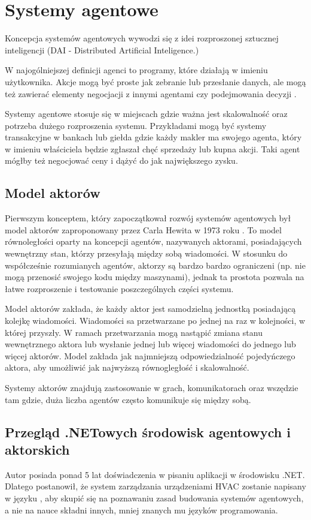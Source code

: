 \chapter{Systemy agentowe}
Koncepcja systemów agentowych wywodzi się z idei rozproszonej sztucznej inteligencji (DAI - Distributed Artificial Inteligence.)

W najogólniejszej definicji agenci to programy, które działają w imieniu użytkownika. 
Akcje mogą być proste jak zebranie lub przesłanie danych, ale mogą też zawierać elementy negocjacji z innymi agentami czy podejmowania decyzji \cite{bib:agenciNazewnictwo}. 

Systemy agentowe stosuje się w miejscach gdzie ważna jest skalowalność oraz potrzeba dużego rozproszenia systemu. 
Przykładami mogą być systemy transakcyjne w bankach lub giełda gdzie każdy makler ma swojego agenta, który w imieniu właściciela będzie zgłaszał chęć sprzedaży lub kupna akcji. Taki agent mógłby też negocjować ceny i dążyć do jak największego zysku.

\section{Model aktorów}
Pierwszym konceptem, który zapoczątkował rozwój systemów agentowych był model aktorów zaproponowany przez Carla Hewita w 1973 roku \cite{bib:aktorzyHewitt}. 
To model równoległości oparty na koncepcji agentów, nazywanych aktorami, posiadających wewnętrzny stan, którzy przesyłają między sobą wiadomości. W stosunku do współcześnie rozumianych agentów, aktorzy są bardzo bardzo ograniczeni (np. nie mogą przenosić swojego kodu między maszynami), jednak ta prostota pozwala na łatwe rozproszenie i testowanie poszczególnych części systemu. 

Model aktorów zakłada, że każdy aktor jest samodzielną jednostką posiadającą kolejkę wiadomości. Wiadomości sa przetwarzane po jednej na raz w kolejności, w której przyszły. W ramach przetwarzania mogą nastąpić zmiana stanu wewnętrznego aktora lub wysłanie jednej lub więcej wiadomości do jednego lub więcej aktorów. Model zakłada jak najmniejszą odpowiedzialność pojedyńczego aktora, aby umożliwić jak najwyższą równogległość i skalowalność. 

Systemy aktorów znajdują zastosowanie w grach, komunikatorach oraz wszędzie tam gdzie, duża liczba agentów często komunikuje się między sobą. \cite{bib:akkaUseCases}

\section{Przegląd .NETowych środowisk agentowych i aktorskich}
Autor posiada ponad 5 lat doświadczenia w pisaniu aplikacji w środowisku .NET. 
Dlatego postanowił, że system zarządzania urządzeniami HVAC zostanie napisany w języku \csh, aby skupić się na poznawaniu zasad budowania systemów agentowych, a nie na nauce składni innych, mniej znanych mu języków programowania. 

